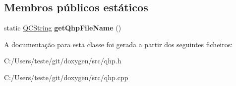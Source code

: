 \subsection*{Membros públicos estáticos}
\begin{DoxyCompactItemize}
\item 
\hypertarget{class_qhp_aa5413d351fdc7f4b82e1a5709f0a358c}{static \hyperlink{class_q_c_string}{Q\-C\-String} {\bfseries get\-Qhp\-File\-Name} ()}\label{class_qhp_aa5413d351fdc7f4b82e1a5709f0a358c}

\end{DoxyCompactItemize}


A documentação para esta classe foi gerada a partir dos seguintes ficheiros\-:\begin{DoxyCompactItemize}
\item 
C\-:/\-Users/teste/git/doxygen/src/qhp.\-h\item 
C\-:/\-Users/teste/git/doxygen/src/qhp.\-cpp\end{DoxyCompactItemize}
